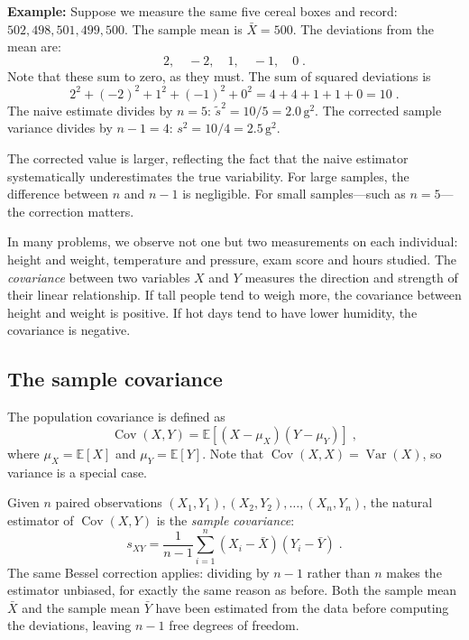 \medskip

\textbf{Example:} Suppose we measure the same five cereal boxes and record: $502, 498, 501, 499, 500$. The sample mean is $\bar{X} = 500$. The deviations from the mean are:
\[
    2, \quad -2, \quad 1, \quad -1, \quad 0 \; .
\]
Note that these sum to zero, as they must. The sum of squared deviations is
\[
    2^2 + (-2)^2 + 1^2 + (-1)^2 + 0^2 = 4 + 4 + 1 + 1 + 0 = 10 \; .
\]
The naive estimate divides by $n = 5$: $\tilde{s}^2 = 10/5 = 2.0\,\text{g}^2$.
The corrected sample variance divides by $n-1 = 4$: $s^2 = 10/4 = 2.5\,\text{g}^2$.

The corrected value is larger, reflecting the fact that the naive estimator systematically underestimates the true variability. For large samples, the difference between $n$ and $n-1$ is negligible. For small samples---such as $n = 5$---the correction matters.

\medskip

In many problems, we observe not one but two measurements on each individual: height and weight, temperature and pressure, exam score and hours studied. The \textit{covariance} between two variables $X$ and $Y$ measures the direction and strength of their linear relationship. If tall people tend to weigh more, the covariance between height and weight is positive. If hot days tend to have lower humidity, the covariance is negative.

\subsection*{The sample covariance}

The population covariance is defined as
\begin{equation}
    \operatorname{Cov}(X, Y) = \mathbb{E}[(X - \mu_X)(Y - \mu_Y)] \; ,
\end{equation}
where $\mu_X = \mathbb{E}[X]$ and $\mu_Y = \mathbb{E}[Y]$. Note that $\operatorname{Cov}(X, X) = \operatorname{Var}(X)$, so variance is a special case.

\medskip

Given $n$ paired observations $(X_1, Y_1), (X_2, Y_2), \dots, (X_n, Y_n)$, the natural estimator of $\operatorname{Cov}(X, Y)$ is the \textit{sample covariance}:
\begin{equation}
    s_{XY} = \frac{1}{n-1}\sum_{i=1}^{n}(X_i - \bar{X})(Y_i - \bar{Y}) \; .
\end{equation}
The same Bessel correction applies: dividing by $n-1$ rather than $n$ makes the estimator unbiased, for exactly the same reason as before. Both the sample mean $\bar{X}$ and the sample mean $\bar{Y}$ have been estimated from the data before computing the deviations, leaving $n-1$ free degrees of freedom.

